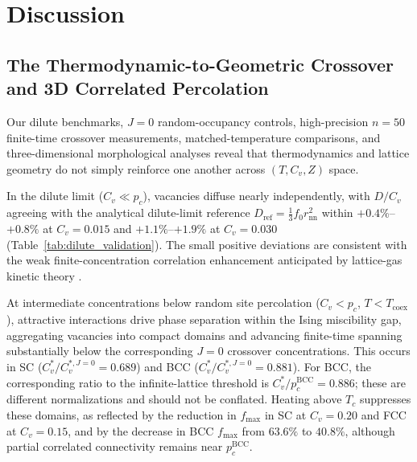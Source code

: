 \documentclass[aps,pre,reprint,superscriptaddress,amsmath,amssymb,floatfix]{revtex4-2}
\begin{document}
\section{Discussion}
\label{sec:discussion}

\subsection{The Thermodynamic-to-Geometric Crossover and 3D Correlated Percolation}
\label{sec:crossover_discussion}

Our dilute benchmarks, $J=0$ random-occupancy controls, high-precision $n=50$ finite-time crossover measurements, matched-temperature comparisons, and three-dimensional morphological analyses reveal that thermodynamics and lattice geometry do not simply reinforce one another across $(T,C_v,Z)$ space.

In the dilute limit ($C_v\ll p_c$), vacancies diffuse nearly independently, with $D/C_v$ agreeing with the analytical dilute-limit reference $D_{\mathrm{ref}}=\frac{1}{3}f_0r_{\mathrm{nn}}^2$ within $+0.4\%$--$+0.8\%$ at $C_v=0.015$ and $+1.1\%$--$+1.9\%$ at $C_v=0.030$ (Table~\ref{tab:dilute_validation}). The small positive deviations are consistent with the weak finite-concentration correlation enhancement anticipated by lattice-gas kinetic theory \cite{Murch1977,Kehr1984}.

At intermediate concentrations below random site percolation ($C_v<p_c$, $T<T_{\mathrm{coex}}$), attractive interactions drive phase separation within the Ising miscibility gap, aggregating vacancies into compact domains and advancing finite-time spanning substantially below the corresponding $J=0$ crossover concentrations. This occurs in SC ($C_v^*/C_v^{*,J=0}=0.689$) and BCC ($C_v^*/C_v^{*,J=0}=0.881$). For BCC, the corresponding ratio to the infinite-lattice threshold is $C_v^*/p_c^{\mathrm{BCC}}=0.886$; these are different normalizations and should not be conflated. Heating above $T_c$ suppresses these domains, as reflected by the reduction in $f_{\max}$ in SC at $C_v=0.20$ and FCC at $C_v=0.15$, and by the decrease in BCC $f_{\max}$ from $63.6\%$ to $40.8\%$, although partial correlated connectivity remains near $p_c^{\mathrm{BCC}}$.
\end{document}
